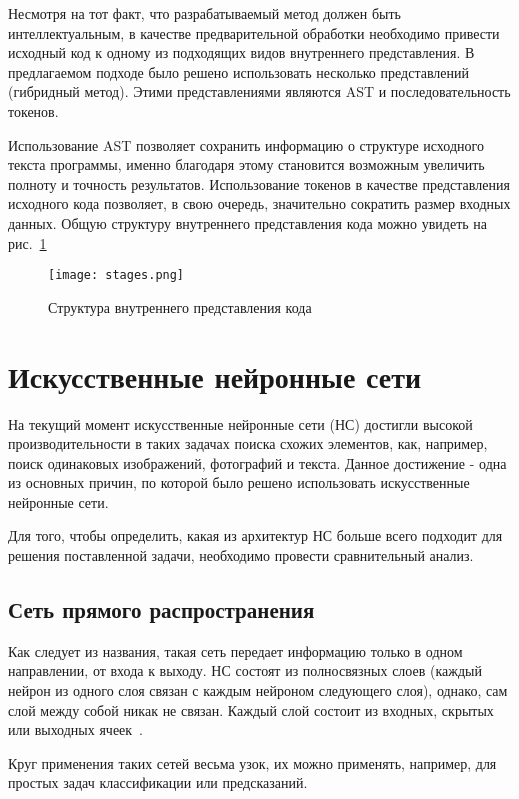 Несмотря на тот факт, что разрабатываемый метод должен быть интеллектуальным, в качестве предварительной обработки необходимо привести исходный код к одному из подходящих видов внутреннего представления. В предлагаемом подходе было решено использовать несколько представлений (гибридный метод). Этими представлениями являются AST и последовательность токенов. 

Использование AST позволяет сохранить информацию о структуре исходного текста программы, именно благодаря этому становится возможным увеличить полноту и точность результатов. Использование токенов в качестве представления исходного кода позволяет, в свою очередь, значительно сократить размер входных данных. Общую структуру внутреннего представления кода можно увидеть на рис.~\ref{fig:stages}

\begin{figure}[htbp]
\centering
\texttt{[image: stages.png]}
\caption{Структура внутреннего представления кода}
\label{fig:stages}
\end{figure}

\section{Искусственные нейронные сети}

На текущий момент искусственные нейронные сети (НС) достигли высокой производительности в таких задачах поиска схожих элементов, как, например, поиск одинаковых изображений, фотографий и текста. Данное достижение - одна из основных причин, по которой было решено использовать искусственные нейронные сети.


Для того, чтобы определить, какая из архитектур НС больше всего подходит для решения поставленной задачи, необходимо провести сравнительный анализ. 

\subsection{Сеть прямого распространения}

Как следует из названия, такая сеть передает информацию только в одном направлении, от входа к выходу. НС состоят из полносвязных слоев (каждый нейрон из одного слоя связан с каждым нейроном следующего слоя), однако, сам слой между собой никак не связан. Каждый слой состоит из входных, скрытых или выходных ячеек~\cite{perceptron}. 

Круг применения таких сетей весьма узок, их можно применять, например, для простых задач классификации или предсказаний. 

